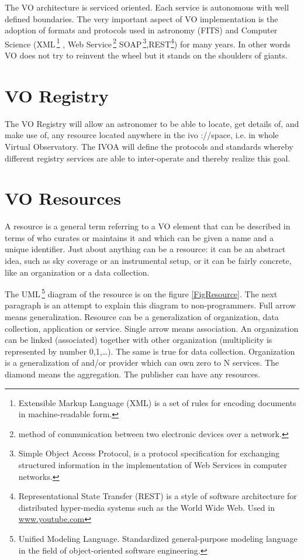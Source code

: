 
    The VO architecture is serviced oriented. Each service is
    autonomous with well defined boundaries. The very important aspect
    of VO implementation is the adoption of formats and protocols used
    in astronomy (FITS) and Computer Science
    (XML\,\footnote{Extensible Markup Language (XML) is a set of rules
      for encoding documents in machine-readable form.} , Web
    Service\,\footnote{method of communication between two electronic
      devices over a network.}  SOAP\,\footnote{Simple Object Access
      Protocol, is a protocol specification for exchanging structured
      information in the implementation of Web Services in computer
      networks.},REST\footnote{Representational State Transfer (REST)
      is a style of software architecture for distributed hyper-media
      systems such as the World Wide Web. Used in
      \url{www.youtube.com} }) for many years. In other words VO does
    not try to reinvent the wheel but it stands on the shoulders of
    giants.

\section{VO Registry}
\noindent 
The VO Registry will allow an astronomer to be able to locate, get
details of, and make use of, any resource located anywhere in the ivo
://space, i.e. in whole Virtual Observatory. The IVOA will define the
protocols and standards whereby different registry services are able
to inter-operate and thereby realize this goal.

\section{VO Resources}
\noindent
A resource is a general term referring to a VO element that can be
described in terms of who curates or maintains it and which can be
given a name and a unique identifier. Just about anything can be a
resource: it can be an abstract idea, such as sky coverage or an
instrumental setup, or it can be fairly concrete, like an organization
or a data collection. \citep{bensonivoa}

The UML\,\footnote{Unified Modeling Language. Standardized
  general-purpose modeling language in the field of object-oriented
  software engineering.}  diagram of the resource is on the figure
\ref{FigResource}. The next paragraph is an attempt to explain this
diagram to non-programmers. Full arrow means generalization. Resource
can be a generalization of organization, data collection, application
or service. Single arrow means association. An organization can be
linked (associated) together with other organization (multiplicity is
represented by number 0,1,\ldots). The same is true for data
collection. Organization is a generalization of and/or provider which
can own zero to N services. The diamond means the aggregation. The
publisher can have any resources.
  

